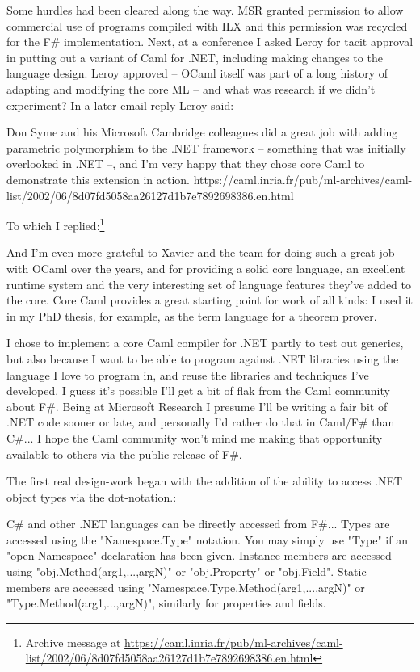 \documentclass[acmsmall,review]{acmart}\settopmatter{printfolios=true,printccs=false,printacmref=false}
\begin{document}
Some hurdles had been cleared along the way. MSR granted permission to allow commercial use of programs compiled with ILX and this permission was recycled for the F\# implementation. Next, at a conference I asked Leroy for tacit approval in putting out a variant of Caml for .NET, including making changes to the language design.  Leroy approved – OCaml itself was part of a long history of adapting and modifying the core ML – and what was research if we didn’t experiment?  In a later email reply Leroy said:

\begin{verbquote}
Don Syme and his Microsoft Cambridge colleagues did a great job with adding parametric polymorphism to the .NET framework -- something that was initially overlooked in .NET --, and I'm very happy that they chose core Caml to demonstrate this extension in action. https://caml.inria.fr/pub/ml-archives/caml-list/2002/06/8d07fd5058aa26127d1b7e7892698386.en.html 
\end{verbquote}

To which I replied:\footnote{Archive message at \url{https://caml.inria.fr/pub/ml-archives/caml-list/2002/06/8d07fd5058aa26127d1b7e7892698386.en.html}}
\begin{verbquote}
And I'm even more grateful to Xavier and the team for doing such a great job with OCaml over the years, and for providing a solid core language, an excellent runtime system and the very interesting set of language features they've added to the core.  Core Caml provides a great starting point for work of all kinds: I used it in my PhD thesis, for example, as the term language for a theorem prover.

I chose to implement a core Caml compiler for .NET partly to test out generics, but also because I want to be able to program against .NET libraries using the language I love to program in, and reuse the libraries and techniques I've developed.  I guess it's possible I'll get a bit of flak from the Caml community about F\#.  Being at Microsoft Research I presume I'll be writing a fair bit of .NET code sooner or late, and personally I'd rather do that in Caml/F\# than C\#... I hope the Caml community won't mind me making that opportunity available to others via the public release of F\#.  
\end{verbquote}
The first real design-work began with the addition of the ability to access .NET object types via the dot-notation.:
\begin{verbquote}
C\# and other .NET languages can be directly accessed from F\#...  Types are accessed using the "Namespace.Type" notation.  You may simply use "Type" if an "open Namespace" declaration has been given. Instance members are accessed using "obj.Method(arg1,...,argN)" or "obj.Property" or "obj.Field". Static members are accessed using "Namespace.Type.Method(arg1,...,argN)" or "Type.Method(arg1,...,argN)", similarly for properties and fields. 
\end{verbquote}
\end{document}
